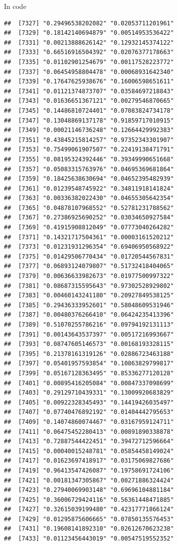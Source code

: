 \documentclass[ignorenonframetext,]{beamer}
\begin{document}
\begin{frame}[fragile]{In code}
\begin{verbatim}
##  [7327] "0.29496538202082" "0.02053711201961"
##  [7329] "0.18142140694879" "0.00514953536422"
##  [7331] "0.00213888626142" "0.12932145374122"
##  [7333] "0.66516916504392" "0.02076377178663"
##  [7335] "0.01102901254679" "0.00117528223772"
##  [7337] "0.06454958804478" "0.00068931642340"
##  [7339] "0.17647625938676" "0.16006598651611"
##  [7341] "0.01121374873707" "0.03584697218843"
##  [7343] "0.01636651367121" "0.00279546870665"
##  [7345] "0.14486810724401" "0.07083824734178"
##  [7347] "0.13048869137178" "0.91859717010915"
##  [7349] "0.00021146736248" "0.12664429992383"
##  [7351] "0.43845215814257" "0.97352343301907"
##  [7353] "0.75499061907507" "0.22419138471791"
##  [7355] "0.08195324392446" "0.39349990651668"
##  [7357] "0.05083315763976" "0.04695369681864"
##  [7359] "0.18425638630694" "0.04652395482939"
##  [7361] "0.01239548745922" "0.34811918141824"
##  [7363] "0.00336382022430" "0.04655305642354"
##  [7365] "0.04878107968552" "0.52781231788562"
##  [7367] "0.27386925690252" "0.03034650927584"
##  [7369] "0.41915908812049" "0.07773040264282"
##  [7371] "0.14321717504361" "0.00003161520212"
##  [7373] "0.01231931296354" "0.69406950568922"
##  [7375] "0.01429506770434" "0.01720544567831"
##  [7377] "0.06893124079807" "0.51732418404065"
##  [7379] "0.00636633982673" "0.01977500997322"
##  [7381] "0.08687315595643" "0.97302528929802"
##  [7383] "0.00460143241180" "0.20927849538125"
##  [7385] "0.29436333952601" "0.58048609531946"
##  [7387] "0.00480376266410" "0.06424235413396"
##  [7389] "0.51070255786216" "0.09794192131113"
##  [7391] "0.00143643537397" "0.00517216993667"
##  [7393] "0.08747605146573" "0.00168193328115"
##  [7395] "0.21378161319126" "0.02886723463188"
##  [7397] "0.05401957593854" "0.10863829799817"
##  [7399] "0.05167128363495" "0.85336277120128"
##  [7401] "0.00895416205084" "0.00847337098699"
##  [7403] "0.29129710439331" "0.13009920683829"
##  [7405] "0.00922328345493" "0.14419426035497"
##  [7407] "0.07740476892192" "0.01404442795653"
##  [7409] "0.14074860074467" "0.03167959124711"
##  [7411] "0.06475452280413" "0.00891890338878"
##  [7413] "0.72887544422451" "0.39472712596664"
##  [7415] "0.00040015248781" "0.05854458149024"
##  [7417] "0.01623697418917" "0.03175069827686"
##  [7419] "0.96413547426087" "0.19758691724106"
##  [7421] "0.00181347305867" "0.00271886324424"
##  [7423] "0.27940069903148" "0.69696104881184"
##  [7425] "0.36006729424116" "0.56361448471885"
##  [7427] "0.32615039199480" "0.42317771866124"
##  [7429] "0.01295875606665" "0.07850135576453"
##  [7431] "0.19608141892310" "0.02612670623238"
##  [7433] "0.01123456443019" "0.00547519552352"

\end{verbatim}
\end{frame}
\end{document}
